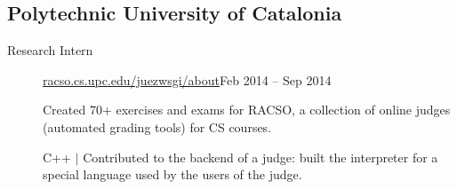 \documentclass[letterpaper,10pt,oneside]{article}
\begin{document}
\subsection*{Polytechnic University of Catalonia}
\vspace{-2px}
\begin{description}
\item[Research Intern]\quad \href{https://racso.cs.upc.edu/juezwsgi/about}{racso.cs.upc.edu/juezwsgi/about}\hfill Feb 2014 -- Sep 2014

\noindent Created 70+ exercises and exams for RACSO, a collection of online judges (automated grading tools) for CS courses.

\vspace{2px}
\noindent C++ $|$ Contributed to the backend of a judge: built the interpreter for a special language used by the users of the judge.
\end{description}
\end{document}
